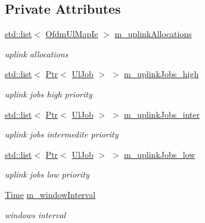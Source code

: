 \subsection*{Private Attributes}
\begin{DoxyCompactItemize}
\item 
\hyperlink{openflow-interface_8h_afd9bcfa176617760671b67580f536fa7}{std\+::list}$<$ \hyperlink{classns3_1_1OfdmUlMapIe}{Ofdm\+Ul\+Map\+Ie} $>$ \hyperlink{classns3_1_1UplinkSchedulerMBQoS_afdca0f835bd9f2b31ad19a7a2a2f4382}{m\+\_\+uplink\+Allocations}
\begin{DoxyCompactList}\small\item\em uplink allocations \end{DoxyCompactList}\item 
\hyperlink{openflow-interface_8h_afd9bcfa176617760671b67580f536fa7}{std\+::list}$<$ \hyperlink{classns3_1_1Ptr}{Ptr}$<$ \hyperlink{classns3_1_1UlJob}{Ul\+Job} $>$ $>$ \hyperlink{classns3_1_1UplinkSchedulerMBQoS_acb8b5539e366b4942381b08edccfba4b}{m\+\_\+uplink\+Jobs\+\_\+high}
\begin{DoxyCompactList}\small\item\em uplink jobs high priority \end{DoxyCompactList}\item 
\hyperlink{openflow-interface_8h_afd9bcfa176617760671b67580f536fa7}{std\+::list}$<$ \hyperlink{classns3_1_1Ptr}{Ptr}$<$ \hyperlink{classns3_1_1UlJob}{Ul\+Job} $>$ $>$ \hyperlink{classns3_1_1UplinkSchedulerMBQoS_a70eef7c9cb6dad5e71a2105e07d1ec69}{m\+\_\+uplink\+Jobs\+\_\+inter}
\begin{DoxyCompactList}\small\item\em uplink jobs intermedite priority \end{DoxyCompactList}\item 
\hyperlink{openflow-interface_8h_afd9bcfa176617760671b67580f536fa7}{std\+::list}$<$ \hyperlink{classns3_1_1Ptr}{Ptr}$<$ \hyperlink{classns3_1_1UlJob}{Ul\+Job} $>$ $>$ \hyperlink{classns3_1_1UplinkSchedulerMBQoS_a73b59113ed20a512685dc76e93cf1faa}{m\+\_\+uplink\+Jobs\+\_\+low}
\begin{DoxyCompactList}\small\item\em uplink jobs low priority \end{DoxyCompactList}\item 
\hyperlink{classns3_1_1Time}{Time} \hyperlink{classns3_1_1UplinkSchedulerMBQoS_aa3fb881e781d8cda4e7bb011c30d9f5d}{m\+\_\+window\+Interval}
\begin{DoxyCompactList}\small\item\em windows interval \end{DoxyCompactList}\end{DoxyCompactItemize}

